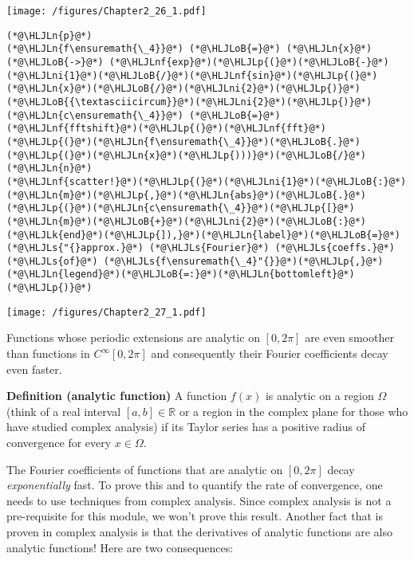 \documentclass[12pt,a4paper]{article}
\newcommand{\HLJLk}[1]{\textcolor[RGB]{148,91,176}{\textbf{#1}}}
\newcommand{\HLJLn}[1]{#1}
\newcommand{\HLJLnf}[1]{\textcolor[RGB]{66,102,213}{#1}}
\newcommand{\HLJLs}[1]{\textcolor[RGB]{201,61,57}{#1}}
\newcommand{\HLJLni}[1]{\textcolor[RGB]{59,151,46}{#1}}
\newcommand{\HLJLoB}[1]{\textcolor[RGB]{102,102,102}{\textbf{#1}}}
\newcommand{\HLJLp}[1]{#1}
\begin{document}
\texttt{[image: /figures/Chapter2\_26\_1.pdf]}

\begin{lstlisting}
(*@\HLJLn{p}@*)
(*@\HLJLn{f\ensuremath{\_4}}@*) (*@\HLJLoB{=}@*) (*@\HLJLn{x}@*) (*@\HLJLoB{->}@*) (*@\HLJLnf{exp}@*)(*@\HLJLp{(}@*)(*@\HLJLoB{-}@*)(*@\HLJLni{1}@*)(*@\HLJLoB{/}@*)(*@\HLJLnf{sin}@*)(*@\HLJLp{(}@*)(*@\HLJLn{x}@*)(*@\HLJLoB{/}@*)(*@\HLJLni{2}@*)(*@\HLJLp{)}@*)(*@\HLJLoB{{\textasciicircum}}@*)(*@\HLJLni{2}@*)(*@\HLJLp{)}@*)
(*@\HLJLn{c\ensuremath{\_4}}@*) (*@\HLJLoB{=}@*) (*@\HLJLnf{fftshift}@*)(*@\HLJLp{(}@*)(*@\HLJLnf{fft}@*)(*@\HLJLp{(}@*)(*@\HLJLn{f\ensuremath{\_4}}@*)(*@\HLJLoB{.}@*)(*@\HLJLp{(}@*)(*@\HLJLn{x}@*)(*@\HLJLp{)))}@*)(*@\HLJLoB{/}@*)(*@\HLJLn{n}@*)
(*@\HLJLnf{scatter!}@*)(*@\HLJLp{(}@*)(*@\HLJLni{1}@*)(*@\HLJLoB{:}@*)(*@\HLJLn{m}@*)(*@\HLJLp{,}@*)(*@\HLJLn{abs}@*)(*@\HLJLoB{.}@*)(*@\HLJLp{(}@*)(*@\HLJLn{c\ensuremath{\_4}}@*)(*@\HLJLp{[}@*)(*@\HLJLn{m}@*)(*@\HLJLoB{+}@*)(*@\HLJLni{2}@*)(*@\HLJLoB{:}@*)(*@\HLJLk{end}@*)(*@\HLJLp{]),}@*)(*@\HLJLn{label}@*)(*@\HLJLoB{=}@*)(*@\HLJLs{"{}approx.}@*) (*@\HLJLs{Fourier}@*) (*@\HLJLs{coeffs.}@*) (*@\HLJLs{of}@*) (*@\HLJLs{f\ensuremath{\_4}"{}}@*)(*@\HLJLp{,}@*)(*@\HLJLn{legend}@*)(*@\HLJLoB{=:}@*)(*@\HLJLn{bottomleft}@*)(*@\HLJLp{)}@*)
\end{lstlisting}

\texttt{[image: /figures/Chapter2\_27\_1.pdf]}

Functions whose periodic extensions  are analytic on $[0, 2\pi]$ are even smoother than functions in $C^{\infty}[0, 2\pi]$ and consequently their Fourier coefficients decay even faster.

\textbf{Definition (analytic function)} A function $f(x)$ is analytic on a region $\Omega$ (think of a real interval $[a, b] \in \mathbb{R}$ or a region in the complex plane for those who have studied complex analysis) if its Taylor series has a positive radius of convergence for every $x \in \Omega$.

The Fourier coefficients of functions that are analytic on $[0, 2\pi]$ decay \emph{exponentially} fast.  To prove this and to quantify the rate of convergence, one needs to use techniques from complex analysis.  Since complex analysis is not a pre-requisite for this module, we won't prove this result.  Another fact that is proven in complex analysis is that the derivatives of analytic functions are also analytic functions! Here are two consequences:
\end{document}
